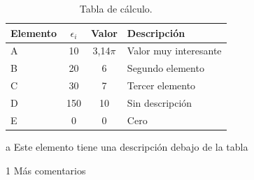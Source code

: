 \begin{appendixd}
	\enabletablerowcolor[2] %
	\begin{table}[H]
		\begin{threeparttable}
		\centering
		\caption{Tabla de cálculo.}
		\begin{tabular}{T{2cm}ccC{4cm}}
			\hline
			\textbf{Elemento} & $\epsilon_i$ & \textbf{Valor} & \textbf{Descripción} \bigstrut \\
			\hline
			A     & 10    & 3,14$\pi$ & Valor muy interesante \\
			B     & 20    & 6 & Segundo elemento \\
			C     & 30    & 7 & Tercer elemento \\
			D     & 150    & 10 & Sin descripción \\
			E     & 0    & 0 & Cero \\
			\hline
			\end{tabular}
		\begin{tablenotes}
			\item[a] Este elemento tiene una descripción debajo de la tabla
			\item[1] Más comentarios
		\end{tablenotes}
		\end{threeparttable}
		\label{tab:anexo-1}
	\end{table}
	\disabletablerowcolor %

\end{appendixd}